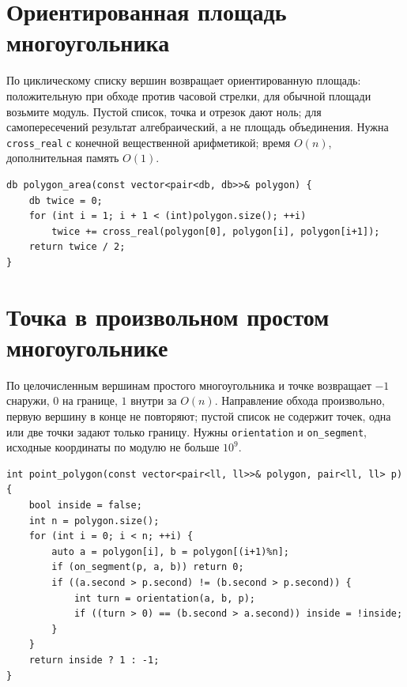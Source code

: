 \section{Ориентированная площадь многоугольника}
По циклическому списку вершин возвращает ориентированную площадь: положительную при обходе против часовой стрелки, для обычной площади возьмите модуль.
Пустой список, точка и отрезок дают ноль; для самопересечений результат алгебраический, а не площадь объединения.
Нужна \texttt{cross\_real} с конечной вещественной арифметикой; время $O(n)$, дополнительная память $O(1)$.
\begin{lstlisting}[name=geometry_area]
db polygon_area(const vector<pair<db, db>>& polygon) {
    db twice = 0;
    for (int i = 1; i + 1 < (int)polygon.size(); ++i)
        twice += cross_real(polygon[0], polygon[i], polygon[i+1]);
    return twice / 2;
}
\end{lstlisting}
%

\section{Точка в произвольном простом многоугольнике}
По целочисленным вершинам простого многоугольника и точке возвращает $-1$ снаружи, $0$ на границе, $1$ внутри за $O(n)$.
Направление обхода произвольно, первую вершину в конце не повторяют; пустой список не содержит точек, одна или две точки задают только границу.
Нужны \texttt{orientation} и \texttt{on\_segment}, исходные координаты по модулю не больше $10^9$.
\begin{lstlisting}[name=geometry_point_polygon]
int point_polygon(const vector<pair<ll, ll>>& polygon, pair<ll, ll> p) {
    bool inside = false;
    int n = polygon.size();
    for (int i = 0; i < n; ++i) {
        auto a = polygon[i], b = polygon[(i+1)%n];
        if (on_segment(p, a, b)) return 0;
        if ((a.second > p.second) != (b.second > p.second)) {
            int turn = orientation(a, b, p);
            if ((turn > 0) == (b.second > a.second)) inside = !inside;
        }
    }
    return inside ? 1 : -1;
}
\end{lstlisting}
%

